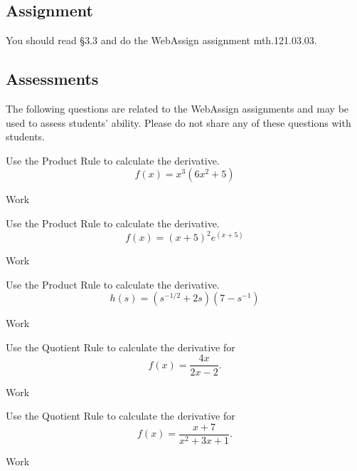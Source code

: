 \documentclass[12pt,addpoints, answers, fleqn]{exam}
\begin{document}
\subsection{Assignment}
You should read \S  3.3 and do the WebAssign assignment mth.121.03.03.
\vfill
\pagebreak
\begin{teacher}
\subsection{Assessments}
The following questions are related to the WebAssign assignments and may be used to assess students' ability. Please do not share any of these questions with students.
\begin{questions}		
\question 	%

Use the Product Rule to calculate the derivative.
\[
f \left( x \right) = x^3 \left( 6x^2 + 5 \right)
\]
\begin{solution}
Work
\end{solution}

\question 	%

Use the Product Rule to calculate the derivative.
\[
f \left( x \right) = \left( x+5\right)^2 e^{\left(x+5\right)}
\]
\begin{solution}
Work
\end{solution}

\question 	%

Use the Product Rule to calculate the derivative.
\[
h \left( s \right) = \left( s^{-1/2} + 2 s \right) \left( 7 - s^{-1} \right) 
\]
\begin{solution}
Work
\end{solution}

\question 	%

Use the Quotient Rule to calculate the derivative for
\[
f\left(x\right) = \frac{4x}{2x- 2}.
\]
\begin{solution}
Work
\end{solution}


\question 	%

Use the Quotient Rule to calculate the derivative for
\[
f\left(x\right) = \frac{x+7}{x^2+3x+1}.
\]
\begin{solution}
Work
\end{solution}


\end{questions}
\end{teacher}
\end{document}
